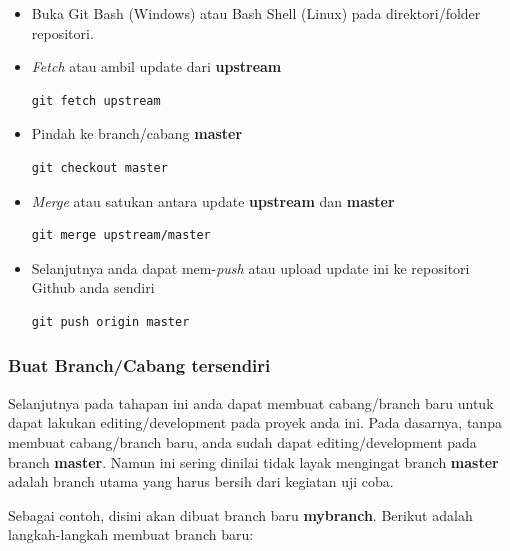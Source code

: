 \documentclass[12pt]{article}
\begin{document}
	\begin{itemize}
		\item Buka Git Bash (Windows) atau Bash Shell (Linux) pada direktori/folder repositori.
		
		\item \textit{Fetch} atau ambil update dari \textbf{upstream}
		\begin{verbatim}
git fetch upstream
		\end{verbatim}
		
		\item Pindah ke branch/cabang \textbf{master}
		\begin{verbatim}
git checkout master
		\end{verbatim}
		
		\item \textit{Merge} atau satukan antara update \textbf{upstream} dan \textbf{master}
		\begin{verbatim}
git merge upstream/master
		\end{verbatim}
		
		\item Selanjutnya anda dapat mem-\textit{push} atau upload update ini ke repositori Github anda sendiri
		\begin{verbatim}
git push origin master
		\end{verbatim}
	\end{itemize}

	\subsubsection{Buat Branch/Cabang tersendiri}
	
	Selanjutnya pada tahapan ini anda dapat membuat cabang/branch baru untuk dapat lakukan editing/development pada proyek anda ini.
	Pada dasarnya, tanpa membuat cabang/branch baru, anda sudah dapat editing/development pada branch \textbf{master}.
	Namun ini sering dinilai tidak layak mengingat branch \textbf{master} adalah branch utama yang harus bersih dari kegiatan uji coba.
	
	Sebagai contoh, disini akan dibuat branch baru \textbf{mybranch}.
	Berikut adalah langkah-langkah membuat branch baru:
	
\end{document}
